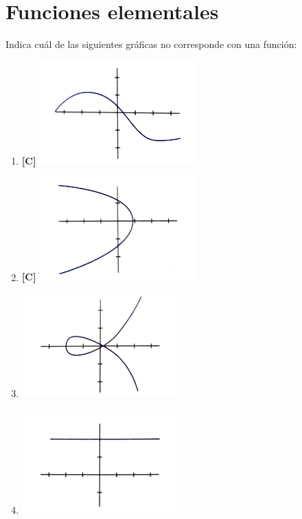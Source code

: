 \chapter{Funciones elementales}
\setcounter{exercicio}{0}



\Exercicio Indica cuál de las siguientes gráficas no corresponde con una función:
	
\begin{enumerate}[topsep=0pt]
	\item \textbf{[C]} \includegraphics[height=4cm]{../img/funciones-grafica1.png}
	\item \textbf{[C]} \includegraphics[height=4cm]{../img/funciones-grafica3.png}
	\item \includegraphics[height=4cm]{../img/funciones-grafica4.png}
	\item \includegraphics[height=4cm]{../img/funciones-grafica6.png}
\end{enumerate}

